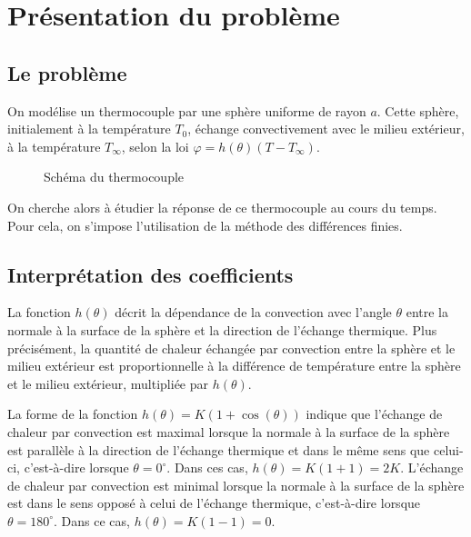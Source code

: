 \documentclass[fleqn]{article}
\renewcommand{\phi}{\varphi}
\begin{document}
\newpage

\tableofcontents
\newpage

\section{Présentation du problème}
\subsection{Le problème}
On modélise un thermocouple par une sphère uniforme de rayon $a$. Cette sphère, initialement à la température $T_0$, échange convectivement avec le milieu extérieur, à la température $T_\infty$, selon la loi $\phi = h(\theta) ( T - T_\infty)$. 
\begin{figure}[H]
    \centering
    \caption{Schéma du thermocouple}
\end{figure}


On cherche alors à étudier la réponse de ce thermocouple au cours du temps. Pour cela, on s'impose l'utilisation de la méthode des différences finies.


\subsection{Interprétation des coefficients}
La fonction $h(\theta)$ décrit la dépendance de la convection avec l'angle $\theta$ entre la normale à la surface de la sphère et la direction de l'échange thermique. Plus précisément, la quantité de chaleur échangée par convection entre la sphère et le milieu extérieur est proportionnelle à la différence de température entre la sphère et le milieu extérieur, multipliée par $h(\theta)$.

La forme de la fonction $h(\theta) = K (1 + \cos(\theta))$ indique que l'échange de chaleur par convection est maximal lorsque la normale à la surface de la sphère est parallèle à la direction de l'échange thermique et dans le même sens que celui-ci, c'est-à-dire lorsque $\theta = 0^\circ$. Dans ces cas, $h(\theta) = K (1 + 1) = 2K$. L'échange de chaleur par convection est minimal lorsque la normale à la surface de la sphère est dans le sens opposé à celui de l'échange thermique, c'est-à-dire lorsque $\theta = 180^\circ$. Dans ce cas, $h(\theta) = K (1 - 1) = 0$.
\end{document}
